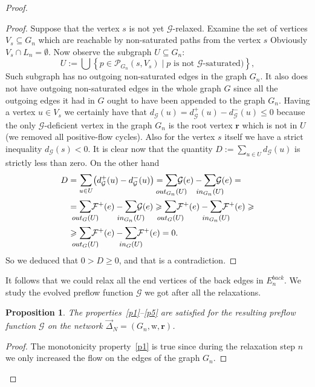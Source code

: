 \documentclass[12pt]{article}
\renewcommand{\cal}[1]{\mathcal{#1}}
\renewcommand{\leq}{\leqslant}
\renewcommand{\geq}{\geqslant}
\newtheorem{prop}{Proposition}
\theoremstyle{definition}
\newcommand{\wt}{\mathrm{w}}
\newcommand{\flowpos}{\mathcal{F}^{+}}
\newcommand{\ein}{in}
\newcommand{\eout}{out}
\newcommand{\eback}{E^{back}}
\renewcommand{\root}{\mathbf{r}}
\newcommand{\onet}{\vec{\Delta}}
\newcommand{\gnpaths}{\cal{P}_{G_n}}
\numberwithin{remark}{section}
\numberwithin{theorem}{section}
\numberwithin{prop}{section}
\numberwithin{equation}{section}
\numberwithin{lemma}{section}
\numberwithin{prop_under_lemma}{lemma}
\begin{document}
\begin{proof}
\begin{proof}
        Suppose that the vertex $s$ is not yet $\cal{G}$-relaxed.
        Examine the set of vertices $V_s \subseteq G_n$ which are reachable by non-saturated paths from the vertex $s$
        Obviously $V_s \cap L_n = \emptyset$.
        Now observe the subgraph $U \subseteq G_n$:
        \[
          U := \bigcup \left\{p \in \gnpaths(s, V_s) \mid \text{$p$ is not $\cal{G}$-saturated})\right\},
        \]
        Such subgraph has no outgoing non-saturated edges in the graph $G_n$.
        It also does not have outgoing non-saturated edges in the whole graph $G$ since all the outgoing edges it had in $G$
          ought to have been appended to the graph $G_n$.
        Having a vertex $u \in V_s$ we certainly have that $d_{\cal{G}}(u) = d^{+}_{\cal{G}}(u) - d^{-}_{\cal{G}}(u) \leq 0$ because
          the only $\cal{G}$-deficient vertex in the graph $G_n$ is the root vertex $\root$ which is not in $U$ (we removed all positive-flow
          cycles).
        Also for the vertex $s$ itself we have a strict inequality $d_{\cal{G}}(s) < 0$.
        It is clear now that the quantity $D := \sum_{u \in U} d_{\cal{G}}(u)$ is strictly less than zero.
        On the other hand
        \[
        \begin{split}
          D &= \mathlarger\sum_{u \in U} \big(d^{+}_{\cal{G}}(u) - d^{-}_{\cal{G}}(u)\big)
          = \mathlarger{\smashoperator{\sum_{\eout_{G_n}(U)}}} \cal{G}(e) - \mathlarger{\smashoperator{\sum_{\ein_{G_n}(U)}}} \cal{G}(e) = \\
          &= \mathlarger{\smashoperator{\sum_{\eout_{G}(U)}}} \flowpos(e) - \mathlarger{\smashoperator{\sum_{\ein_{G_n}(U)}}} \cal{G}(e)
            \geq \mathlarger{\smashoperator{\sum_{\eout_G(U)}}} \flowpos(e) - \mathlarger{\smashoperator{\sum_{\ein_{G_n}(U)}}} \flowpos(e) \geq \\
          &\geq \mathlarger{\smashoperator{\sum_{\eout_G(U)}}} \flowpos(e) - \mathlarger{\smashoperator{\sum_{\ein_{G}(U)}}} \flowpos(e) = 0.
        \end{split}
      \]
        So we deduced that $0 > D \geq 0$, and that is a contradiction.
      \end{proof}
      It follows that we could relax all the end vertices of the back edges in $\eback_n$.
      We study the evolved preflow function $\cal{G}$ we got after all the relaxations.
      \begin{prop}
        The properties~\ref{p1}--\ref{p5} are satisfied for the resulting preflow function $\cal{G}$ on the network $\onet_N = (G_n, \wt, \root)$.
      \end{prop}
      \begin{proof}
        The monotonicity property~\ref{p1} is true since during the relaxation step $n$ we
          only increased the flow on the edges of the graph $G_n$.


\end{proof}
\end{proof}
\end{document}
